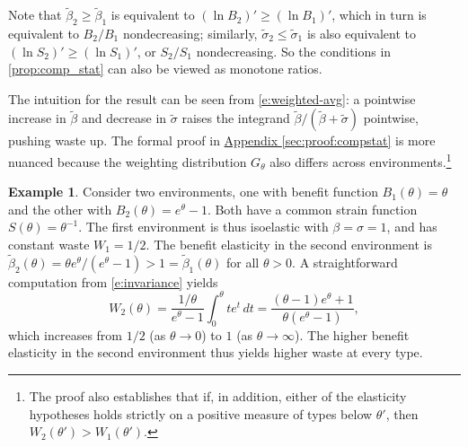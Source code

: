 \documentclass[12 pt]{article}
\newcommand{\appendixref}[1]{\hyperref[#1]{Appendix \ref{#1}}}
\theoremstyle{remark}
\theoremstyle{definition}
\newtheorem{example}{Example}
\newcommand{\elaB}{\tilde\beta}   %
\newcommand{\elaS}{\tilde\sigma}  %
\let\oldfootnote\footnote
\renewcommand\footnote[1]{\oldfootnote{\hspace{.5mm}#1}}
\begin{document}
Note that $\elaB_2\geq\elaB_1$ is equivalent to $(\ln B_2)'\geq(\ln B_1)'$, which in turn is equivalent to $B_2/B_1$ nondecreasing;  similarly, $\elaS_2\leq\elaS_1$ is also equivalent to $(\ln S_2)' \geq (\ln S_1)'$,  or $S_2/S_1$ nondecreasing. So the conditions in \autoref{prop:comp_stat} can also be viewed as monotone ratios.



The intuition for the result can be seen from \autoref{e:weighted-avg}: a pointwise increase in $\elaB$ and decrease in $\elaS$ raises the integrand $\elaB/(\elaB+\elaS)$ pointwise, pushing waste up. The formal proof in \appendixref{sec:proof:compstat} is more nuanced because the weighting distribution $G_\theta$ also differs across environments.\footnote{The proof also establishes that if, in addition, either of the elasticity hypotheses holds strictly on a positive measure of types below $\theta'$, then $W_2(\theta')>W_1(\theta')$.}

\begin{example}
\label{eg:comp_stat}
Consider two environments, one with benefit function $B_1(\theta)=\theta$ and the other with $B_2(\theta)=e^\theta-1$. Both have a common strain function $S(\theta)=\theta^{-1}$. The first environment is thus isoelastic with $\beta = \sigma=1$, and has constant waste $W_1=1/2$. The benefit elasticity in the second environment is $\elaB_2(\theta)=\theta e^\theta/(e^\theta-1) > 1=\elaB_1(\theta)$ for all $\theta>0$.
A straightforward computation from \autoref{e:invariance} yields
\[W_2(\theta)=\frac{1 / \theta}{e^\theta-1} \int_0^\theta t e^t \, d t=\frac{(\theta-1)e^\theta+1}{\theta(e^\theta-1)},\]
which increases from $1/2$ (as $\theta\to 0$) to $1$ (as $\theta\to\infty$). The higher benefit elasticity in the second environment thus yields higher waste at every type.
\end{example}
\end{document}
